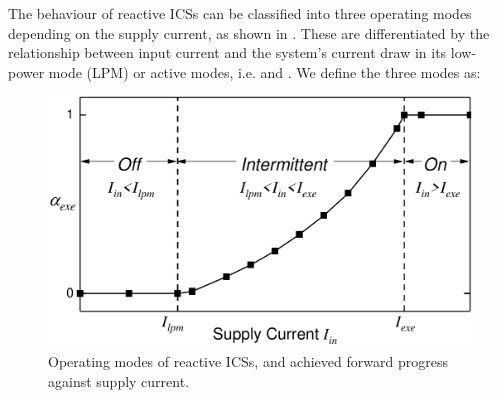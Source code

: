 The behaviour of reactive ICSs can be classified into three operating modes depending on the supply current, as shown in . These are differentiated by the relationship between input current  and the system's current draw in its low-power mode (LPM) or active modes, i.e.  and . We define the three modes as:

\begin{figure}[!t]
    \centering
    \includegraphics[width=0.8\columnwidth]{ch3_sizingeffect/figures/OperatingMode0Fig}
    \caption{Operating modes of reactive ICSs, and achieved forward progress against supply current.}
    \label{fig:operatingModes}
\end{figure}

